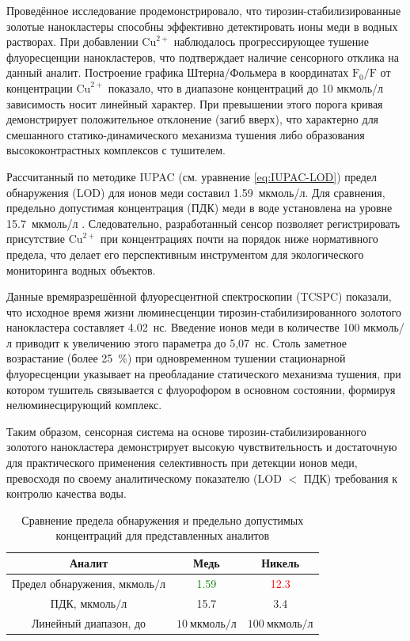\documentclass[a4paper, 12pt]{article}
\begin{document}
\begin{onehalfspace}
	Проведённое исследование продемонстрировало, что тирозин-стабилизированные золотые нанокластеры способны эффективно детектировать ионы меди в водных растворах. При добавлении $\text{Cu}^{2+}$ наблюдалось прогрессирующее тушение флуоресценции нанокластеров, что подтверждает наличие сенсорного отклика на данный аналит.
	Построение графика Штерна\-/Фольмера в координатах $\text{F}_0/\text{F}$ от концентрации $\text{Cu}^{2+}$ показало, что в диапазоне концентраций {до 10 мкмоль/л} зависимость носит линейный характер. При превышении этого порога кривая демонстрирует {положительное отклонение (загиб вверх)}, что характерно для смешанного статико-динамического механизма тушения либо образования высококонтрастных комплексов с тушителем.

	Рассчитанный по методике IUPAC (см. уравнение \ref{eq:IUPAC-LOD}) предел обнаружения (LOD) для ионов меди составил {1.59~мкмоль/л}. Для сравнения, предельно допустимая концентрация (ПДК) меди в воде установлена на уровне 15.7~мкмоль/л \cite[с.~463]{sanpin_1_2_3685_21}. Следовательно, разработанный сенсор позволяет регистрировать присутствие $\text{Cu}^{2+}$ {при концентрациях почти на порядок ниже нормативного предела}, что делает его перспективным инструментом для экологического мониторинга водных объектов.

	Данные времяразрешённой флуоресцентной спектроскопии (TCSPC) показали, что исходное время жизни люминесценции тирозин-стабилизированного золотого нанокластера составляет {4.02~нс}.
	Введение ионов меди в количестве 100 мкмоль/л приводит к увеличению этого параметра до {5,07~нс}.
	Столь заметное возрастание (более 25~\%) при одновременном тушении стационарной флуоресценции указывает на преобладание {статического механизма тушения}, при котором тушитель связывается с флуорофором в основном состоянии, формируя нелюминесцирующий комплекс.

	Таким образом, сенсорная система на основе тирозин-стабилизированного золотого нанокластера демонстрирует {высокую чувствительность и достаточную для практического применения селективность} при детекции ионов меди, превосходя по своему аналитическому показателю (LOD $<$ ПДК) требования к контролю качества воды.

	\begin{table}[H]
	\centering
	\caption{Сравнение предела обнаружения и предельно допустимых концентраций для представленных аналитов}
	\label{tab:LOD-TVL}
	\begin{tabular}{|c|c|c|}
	\hline
	\textbf{Аналит}                & \textbf{Медь}         & \textbf{Никель}  \\\hline
	Предел обнаружения, $\text{мкмоль}/\text{л}$   & \textcolor{green}{1.59} & \textcolor{red}{12.3} \\\hline
	ПДК, $\text{мкмоль}/\text{л}$   &    15.7                 &   3.4                \\\hline
	Линейный диапазон, до & $10~\text{мкмоль}/\text{л}$ & $100~\text{мкмоль}/\text{л}$\\\hline
	\end{tabular}
	\end{table}


\end{onehalfspace}
\end{document}
